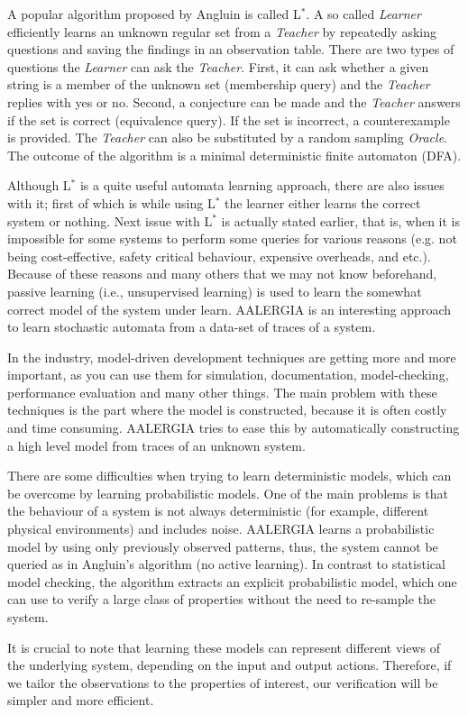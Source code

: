 \documentclass[
a4paper,
12pt
]{scrartcl}
\begin{document}
\par A popular algorithm proposed by Angluin\cite{Angluin.1987} is called L$^*$. A so called \textit{Learner} efficiently learns an unknown regular set from a \textit{Teacher} by repeatedly asking questions and saving the findings in an observation table. There are two types of questions the \textit{Learner} can ask the \textit{Teacher}. First, it can ask whether a given string is a member of the unknown set (membership query) and the \textit{Teacher} replies with yes or no. Second, a conjecture can be made and the \textit{Teacher} answers if the set is correct (equivalence query). If the set is incorrect, a counterexample is provided. The \textit{Teacher} can also be substituted by a random sampling \textit{Oracle}. The outcome of the algorithm is a minimal deterministic finite automaton (DFA).
\par Although L$^*$ is a quite useful automata learning approach, there are also issues with it; first of which is while using L$^*$ the learner either learns the correct system or nothing. Next issue with L$^*$ is actually stated earlier, that is, when it is impossible for some systems to perform some queries for various reasons (e.g. not being cost-effective, safety critical behaviour, expensive overheads, and etc.). Because of these reasons and many others that we may not know beforehand, passive learning (i.e., unsupervised learning) is used to learn the somewhat correct model of the system under learn. AALERGIA\cite{Mao.} is an interesting approach to learn stochastic automata from a data-set of traces of a system.
\par In the industry, model-driven development techniques are getting more and more important, as you can use them for simulation, documentation, model-checking, performance evaluation and many other things. The main problem with these techniques is the part where the model is constructed, because it is often costly and time consuming. AALERGIA tries to ease this by automatically constructing a high level model from traces of an unknown system.
\par There are some difficulties when trying to learn deterministic models, which can be overcome by learning probabilistic models. One of the main problems is that the behaviour of a system is not always deterministic (for example, different physical environments) and includes noise. AALERGIA learns a probabilistic model by using only previously observed patterns, thus, the system cannot be queried as in Angluin's algorithm (no active learning). In contrast to statistical model checking, the algorithm extracts an explicit probabilistic model, which one can use to verify a large class of properties without the need to re-sample the system.
\par It is crucial to note that learning these models can represent different views of the underlying system, depending on the input and output actions. Therefore, if we tailor the observations to the properties of interest, our verification will be simpler and more efficient.
\end{document}
